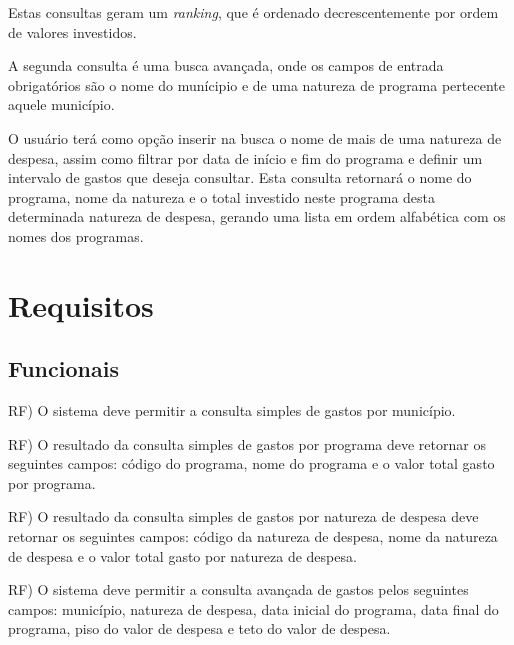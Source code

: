 \documentclass[a4paper,12pt]{article}
\begin{document}
Estas consultas geram um \textit{ranking}, que é ordenado decrescentemente por ordem de valores investidos.

A segunda consulta é uma busca avançada, onde os campos de entrada obrigatórios são o nome do munícipio e de uma natureza de programa pertecente aquele município.

O usuário terá como opção inserir na busca o nome de mais de uma natureza de despesa, assim como filtrar por data de início e fim do programa e definir um intervalo de gastos que deseja consultar. Esta consulta retornará o nome do programa, nome da natureza e o total investido neste programa desta determinada natureza de despesa, gerando uma lista em ordem alfabética com os nomes dos programas.

\section{Requisitos}

\subsection{Funcionais}

\addtocounter{rf}{1}

RF) O sistema deve permitir a consulta simples de gastos por município.\\

\addtocounter{rf}{1}

RF) O resultado da consulta simples de gastos por programa deve retornar os seguintes campos: código do programa, nome do programa e o valor total gasto por programa.\\

\addtocounter{rf}{1}

RF) O resultado da consulta simples de gastos por natureza de despesa deve retornar os seguintes campos: código da natureza de despesa, nome da natureza de despesa e o valor total gasto por natureza de despesa.\\

\addtocounter{rf}{1}

RF) O sistema deve permitir a consulta avançada de gastos pelos seguintes campos: município, natureza de despesa, data inicial do programa, data final do programa, piso do valor de despesa e teto do valor de despesa.\\

\addtocounter{rf}{1}
\end{document}

